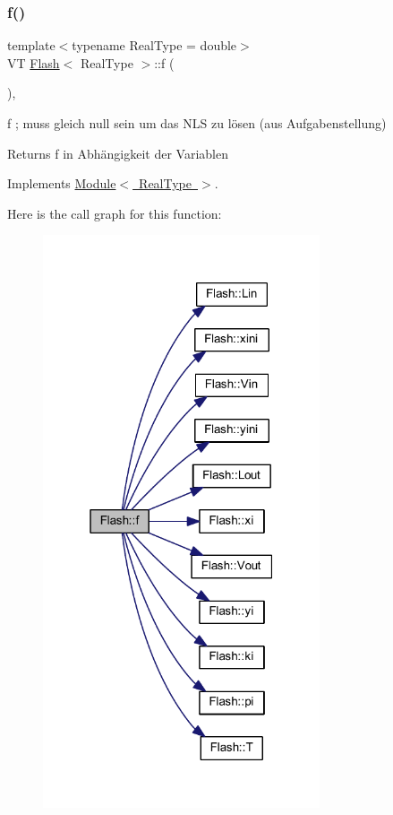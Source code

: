\subsubsection{\texorpdfstring{f()}{f()}}
{\footnotesize\ttfamily template$<$typename Real\+Type = double$>$ \\
VT \mbox{\hyperlink{class_flash}{Flash}}$<$ Real\+Type $>$\+::f (\begin{DoxyParamCaption}{ }\end{DoxyParamCaption})\hspace{0.3cm}{\ttfamily [inline]}, {\ttfamily [virtual]}}



f ; muss gleich null sein um das N\+LS zu lösen (aus Aufgabenstellung) 

\begin{DoxyReturn}{Returns}
f in Abhängigkeit der Variablen 
\end{DoxyReturn}


Implements \mbox{\hyperlink{class_module_ad28dc7d3309858af1011b60b53c51c1a}{Module$<$ Real\+Type $>$}}.

Here is the call graph for this function\+:\nopagebreak
\begin{figure}[H]
\begin{center}
\leavevmode
\includegraphics[width=232pt]{class_flash_abd6eed865f215c9b4633547f154e91ec_cgraph}
\end{center}
\end{figure}
\mbox{\label{class_flash_ae7582896021d0734356b1b5253ac68f1}} 
